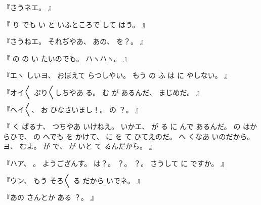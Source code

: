 %
『さうネエ。
』

%
『
り
でも
い
と
いふところで
して%
はう。
』

%
『さうねエ。
%
それぢやあ、
%
あの、
%
を？。
』

%
『
の
の%
い
たいのでも。
%
ハヽハヽ。
』

%
『エヽ
しいヨ、
%
おぼえて
らつしやい。
%
もう
の
ふ
は
に
やしない。
』

%
『オイ〳〵
ぷり〳〵しちやあ
る。
%
む
が
あるんだ、
%
まじめだ。
』

%
『ヘイ〳〵、
%
お
ひなさいまし！。
%
の
？。
』

%
『
く
ばるナ、
%
つちやあ
いけねえ。
%
いかエ、
%
が
る
に
んで
あるんだ。
%
の
はからひで、
%
の
へでも
を
かけて、
%
に
を
て
ひてえのだ。
%
へ
くなあ
いのだから。
%
ヨ、
%
むよ。
%
が
で、
%
が
いと
て
%
るんだから。
』

%
『ハア、
%
。
%
ようござんす。
%
は？。
%
？。
%
？。
%
%
さうして
に
ですか。%
』

%
『ウン、
%
もう
そろ〳〵
る
だから
いでネ。
』

%
『あの
さんとか
ある
？。
』

